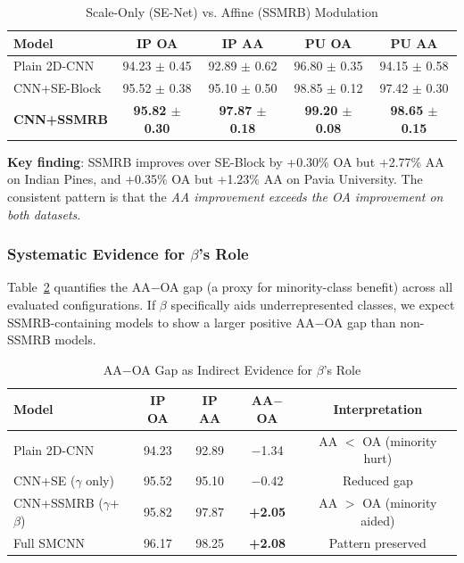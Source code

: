 \documentclass[pdflatex,sn-mathphys-num]{sn-jnl}
\theoremstyle{thmstyleone}
\theoremstyle{thmstyletwo}
\theoremstyle{thmstylethree}
\begin{document}
\begin{table}[!t]
\caption{Scale-Only (SE-Net) vs. Affine (SSMRB) Modulation}
\label{tab:senet_comparison}
\centering

\begin{tabular}{lcccc}
\toprule
\textbf{Model} & \textbf{IP OA} & \textbf{IP AA} & \textbf{PU OA} & \textbf{PU AA} \\
\midrule
Plain 2D-CNN & 94.23 $\pm$ 0.45 & 92.89 $\pm$ 0.62 & 96.80 $\pm$ 0.35 & 94.15 $\pm$ 0.58 \\
CNN+SE-Block & 95.52 $\pm$ 0.38 & 95.10 $\pm$ 0.50 & 98.85 $\pm$ 0.12 & 97.42 $\pm$ 0.30 \\
\textbf{CNN+SSMRB} & \textbf{95.82 $\pm$ 0.30} & \textbf{97.87 $\pm$ 0.18} & \textbf{99.20 $\pm$ 0.08} & \textbf{98.65 $\pm$ 0.15} \\
\bottomrule
\end{tabular}
\end{table}



\textbf{Key finding}: SSMRB improves over SE-Block by +0.30\% OA but +2.77\% AA on Indian Pines, and +0.35\% OA but +1.23\% AA on Pavia University. The consistent pattern is that the \textit{AA improvement exceeds the OA improvement on both datasets}.

\subsubsection{Systematic Evidence for $\beta$'s Role}

Table~\ref{tab:aa_oa_gap} quantifies the AA$-$OA gap (a proxy for minority-class benefit) across all evaluated configurations. If $\beta$ specifically aids underrepresented classes, we expect SSMRB-containing models to show a larger positive AA$-$OA gap than non-SSMRB models.

\begin{table}[!t]
\caption{AA$-$OA Gap as Indirect Evidence for $\beta$'s Role}
\label{tab:aa_oa_gap}
\centering

\begin{tabular}{lcccc}
\toprule
\textbf{Model} & \textbf{IP OA} & \textbf{IP AA} & \textbf{AA$-$OA} & \textbf{Interpretation} \\
\midrule
Plain 2D-CNN & 94.23 & 92.89 & $-$1.34 & AA $<$ OA (minority hurt) \\
CNN+SE ($\gamma$ only) & 95.52 & 95.10 & $-$0.42 & Reduced gap \\
CNN+SSMRB ($\gamma$+$\beta$) & 95.82 & 97.87 & \textbf{+2.05} & AA $>$ OA (minority aided) \\
Full SMCNN & 96.17 & 98.25 & \textbf{+2.08} & Pattern preserved \\
\bottomrule
\end{tabular}
\end{table}
\end{document}
